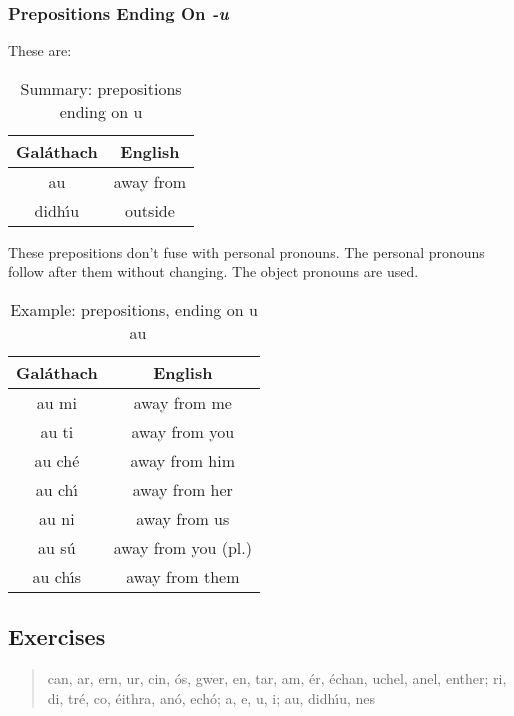 \subsubsection{Prepositions Ending On \textit{-u}}
These are:
\begin{table}[H]
\centering
\begin{tabular}{c|c}
  \textbf{Gal\'{a}thach} & \textbf{English}\\
  \toprule
  au & away from\\
  didh\'{\i}u & outside
\end{tabular}
\caption{Summary: prepositions ending on u}
\label{summary_prepositions_ending_on_u}
\end{table}

These prepositions don't fuse with personal pronouns. The personal pronouns follow after them without changing. The object pronouns are used.
\begin{table}[H]
\centering
\begin{tabular}{c|c}
  \textbf{Gal\'{a}thach} & \textbf{English}\\
  \toprule
  au mi & away from me\\
  au ti & away from you\\
  au ch\'{e} & away from him\\
  au ch\'{\i} & away from her\\
  au ni & away from us\\
  au s\'{u} & away from you (pl.)\\
  au ch\'{\i}s & away from them
\end{tabular}
\caption{Example: prepositions, ending on u \textendash\ au}
\label{example_prepositions_ending_on_u_au}
\end{table}

\newpage
\subsection{Exercises}

\begin{quote}
can, ar, ern, ur, cin, \'{o}s, gwer, en, tar, am, \'{e}r, \'{e}chan, uchel, anel, enther; ri, di, tr\'{e}, co, \'{e}ithra, an\'{o}, ech\'{o}; a, e, u, i; au, didh\'{\i}u, nes
\end{quote}

